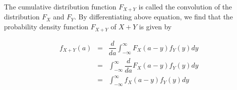 The cumulative distribution function $F_{X+Y}$ is called the convolution of the distribution $F_X$ and $F_Y$. By differentiating above equation, we find that the probability density function $F_{X + Y}$ of $X + Y$ is given by

\begin{eqnarray*}
	f_{X+Y}(a) &=& \dfrac{d}{da}\int^{\infty}_{-\infty}F_X(a - y)f_Y(y)dy\\
	&=& \int^{\infty}_{-\infty}\dfrac{d}{da}F_X(a-y)f_Y(y)dy\\
	&=& \int^{\infty}_{-\infty}f_X(a-y)f_Y(y)dy
\end{eqnarray*}




















